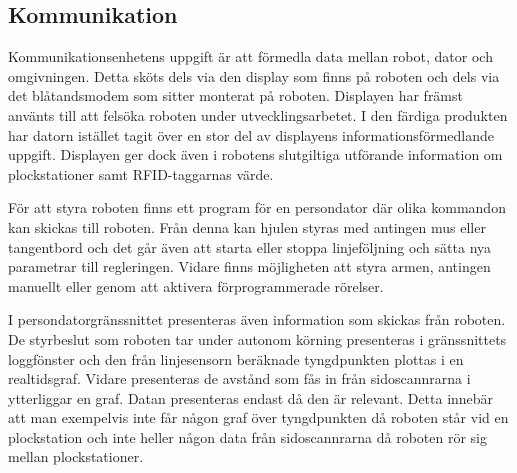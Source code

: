 

\subsection{Kommunikation}

Kommunikationsenhetens uppgift är att förmedla data mellan robot, dator och omgivningen. Detta sköts dels via den display som finns på roboten och dels via det blåtandsmodem som sitter monterat på roboten. Displayen har främst använts till att felsöka roboten under utvecklingsarbetet. I den färdiga produkten har datorn istället tagit över en stor del av displayens informationsförmedlande uppgift. Displayen ger dock även i robotens slutgiltiga utförande information om plockstationer samt RFID-taggarnas värde.

För att styra roboten finns ett program för en persondator där olika kommandon kan skickas till roboten. Från denna kan hjulen styras med antingen mus eller tangentbord och det går även att starta eller stoppa linjeföljning och sätta nya parametrar till regleringen. Vidare finns möjligheten att styra armen, antingen manuellt eller genom att aktivera förprogrammerade rörelser.

I persondatorgränssnittet presenteras även information som skickas från roboten. De styrbeslut som roboten tar under autonom körning presenteras i gränssnittets loggfönster och den från linjesensorn beräknade tyngdpunkten plottas i en realtidsgraf. Vidare presenteras de avstånd som fås in från sidoscannrarna i ytterliggar en graf. Datan presenteras endast då den är relevant. Detta innebär att man exempelvis inte får någon graf över tyngdpunkten då roboten står vid en plockstation och inte heller någon data från sidoscannrarna då roboten rör sig mellan plockstationer.




